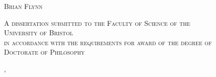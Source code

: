 \begin{titlepage}
{    }%
    \HRule %
    \vspace{2.5cm}
    
    \textsc{\LARGE Brian Flynn}%
        
    \vspace{2.5cm}
    \textsc{
        \normalsize A dissertation submitted to the Faculty of Science of the \\ 
        \vspace{0.15cm}
        \LARGE University of Bristol \\    
        \vspace{0.3cm}
        \normalsize in accordance with the requirements for award of the degree of \\
        \vspace{0.15cm}
        \LARGE Doctorate of Philosophy \\
    }    
    \vspace{1.5cm}
    
    {\Large \monthname, \the\year}\\[1cm] %
    
    \end{titlepage}